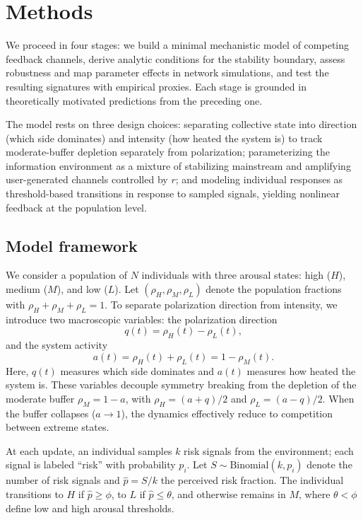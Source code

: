 \documentclass[12pt]{article}
\begin{document}
\FloatBarrier

\section{Methods}
\label{sec:methods}
\noindent We proceed in four stages: we build a minimal mechanistic model of competing feedback channels, derive analytic conditions for the stability boundary, assess robustness and map parameter effects in network simulations, and test the resulting signatures with empirical proxies. Each stage is grounded in theoretically motivated predictions from the preceding one.

The model rests on three design choices: separating collective state into direction (which side dominates) and intensity (how heated the system is) to track moderate-buffer depletion separately from polarization; parameterizing the information environment as a mixture of stabilizing mainstream and amplifying user-generated channels controlled by $r$; and modeling individual responses as threshold-based transitions in response to sampled signals, yielding nonlinear feedback at the population level.

\subsection{Model framework}
We consider a population of $N$ individuals with three arousal states: high ($H$), medium ($M$), and low ($L$). Let $(\rho_H,\rho_M,\rho_L)$ denote the population fractions with $\rho_H+\rho_M+\rho_L=1$. To separate polarization direction from intensity, we introduce two macroscopic variables: the polarization direction
\begin{equation}
q(t)=\rho_H(t)-\rho_L(t),
\label{eq:q}
\end{equation}
and the system activity
\begin{equation}
a(t)=\rho_H(t)+\rho_L(t)=1-\rho_M(t).
\label{eq:a}
\end{equation}
Here, $q(t)$ measures which side dominates and $a(t)$ measures how heated the system is. These variables decouple symmetry breaking from the depletion of the moderate buffer $\rho_M=1-a$, with $\rho_H=(a+q)/2$ and $\rho_L=(a-q)/2$. When the buffer collapses ($a\to 1$), the dynamics effectively reduce to competition between extreme states.

At each update, an individual samples $k$ risk signals from the environment; each signal is labeled ``risk'' with probability $p_i$. Let $S\sim\text{Binomial}(k,p_i)$ denote the number of risk signals and $\hat{p}=S/k$ the perceived risk fraction. The individual transitions to $H$ if $\hat{p}\ge\phi$, to $L$ if $\hat{p}\le\theta$, and otherwise remains in $M$, where $\theta<\phi$ define low and high arousal thresholds.
\end{document}
